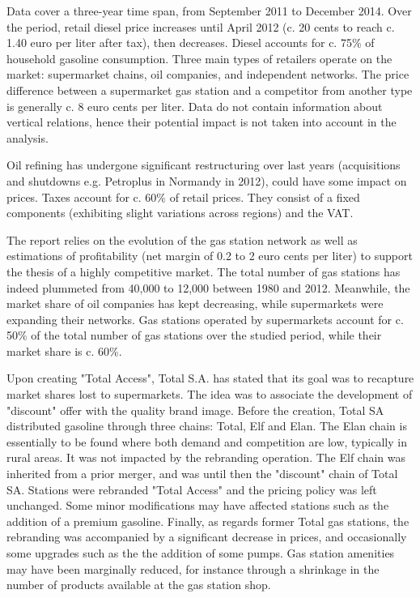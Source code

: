 \documentclass[english]{article}
\begin{document}
Data cover a three-year time span, from September 2011 to December 2014. Over the period, retail diesel price increases until April 2012 (c. 20 cents to reach c. 1.40 euro per liter after tax), then decreases. Diesel accounts for c. 75\% of household gasoline consumption. Three main types of retailers operate on the market: supermarket chains, oil companies, and independent networks. The price difference between a supermarket gas station and a competitor from another type is generally c. 8 euro cents per liter. Data do not contain information about vertical relations, hence their potential impact is not taken into account in the analysis.

Oil refining has undergone significant restructuring over last years (acquisitions and shutdowns e.g. Petroplus in Normandy in 2012), could have some impact on prices. Taxes account for c. 60$\%$ of retail prices. They consist of a fixed components (exhibiting slight variations across regions) and the VAT.
\medskip{}

The \cite{BEL12} report relies on the evolution of the gas station network as well as estimations of profitability (net margin of 0.2 to 2 euro cents per liter) to support the thesis of a highly competitive market. The total number of gas stations
has indeed plummeted from 40,000 to 12,000 between 1980 and 2012. Meanwhile, the market share of oil companies has kept decreasing, while supermarkets were expanding their networks. Gas stations operated by supermarkets account for c. 50\% of the total number of gas stations over the studied period, while their market share is c. 60\%.
\medskip{}

Upon creating "Total Access", Total S.A. has stated that its goal was to recapture market shares lost to supermarkets. The idea was to associate the development of "discount" offer with the quality brand image. Before the creation, Total SA distributed gasoline through three chains: Total, Elf and Elan. The Elan chain is essentially to be found where both demand and competition are low, typically in rural areas. It was not impacted by the rebranding operation. The Elf chain was inherited from a prior merger, and was until then the "discount" chain of Total SA. Stations were rebranded "Total Access" and the pricing policy was left unchanged. Some minor modifications may have affected stations such as the addition of a premium gasoline. Finally, as regards former Total gas stations, the rebranding was accompanied by a significant decrease in prices, and occasionally some upgrades such as the the addition of some pumps. Gas station amenities may have been marginally reduced, for instance through a shrinkage in the number of products available at the gas station shop.
\medskip{}
\end{document}
